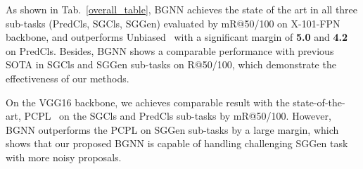

As shown in Tab.~\ref{overall_table}, BGNN achieves the state of the art in all three sub-tasks (PredCls, SGCls, SGGen) evaluated by mR@50/100 on X-101-FPN backbone, and outperforms Unbiased~\cite{tang_unbiased_2020} with a significant margin of \textbf{5.0} and \textbf{4.2} on PredCls. 
Besides, BGNN shows a comparable performance with previous SOTA in SGCls and SGGen sub-tasks on R@50/100, which demonstrate the effectiveness of our methods.

On the VGG16 backbone, we achieves comparable result with the state-of-the-art, PCPL~\cite{yan_pcpl_2020} on the SGCls and PredCls sub-tasks by mR@50/100.
However, BGNN outperforms the PCPL on SGGen sub-tasks by a large margin, which shows that our proposed BGNN is capable of handling challenging SGGen task with more noisy proposals.


